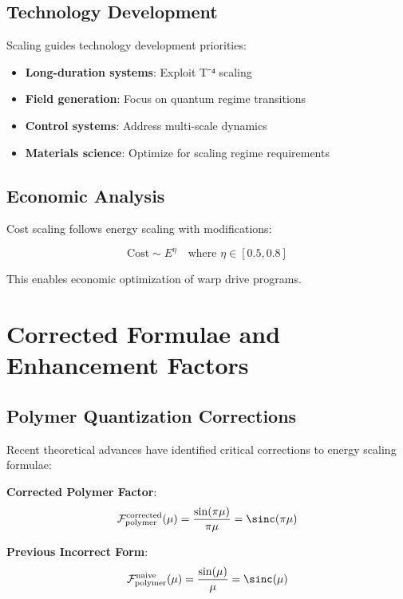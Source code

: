 \documentclass[12pt,a4paper]{article}
\begin{document}
\subsection{Technology Development}

Scaling guides technology development priorities:

\begin{itemize}
\item \textbf{Long-duration systems}: Exploit T⁻⁴ scaling
\item \textbf{Field generation}: Focus on quantum regime transitions
\item \textbf{Control systems}: Address multi-scale dynamics
\item \textbf{Materials science}: Optimize for scaling regime requirements
\end{itemize}

\subsection{Economic Analysis}

Cost scaling follows energy scaling with modifications:

\begin{equation}
\text{Cost} \sim E^{\eta} \quad \text{where } \eta \in [0.5, 0.8]
\end{equation}

This enables economic optimization of warp drive programs.

\section{Corrected Formulae and Enhancement Factors}

\subsection{Polymer Quantization Corrections}

Recent theoretical advances have identified critical corrections to energy scaling formulae:

\textbf{Corrected Polymer Factor}:
\begin{equation}
\mathcal{F}_{\text{polymer}}^{\text{corrected}}(\mu) = \frac{\sin(\pi\mu)}{\pi\mu} = \sinc(\pi\mu)
\end{equation}

\textbf{Previous Incorrect Form}:
\begin{equation}
\mathcal{F}_{\text{polymer}}^{\text{naive}}(\mu) = \frac{\sin(\mu)}{\mu} = \sinc(\mu)
\end{equation}
\end{document}
